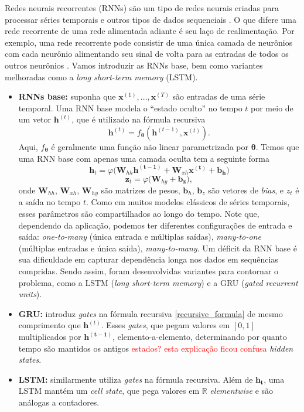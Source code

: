 \documentclass{automatextcc}
\newcommand{\pumi}[1]{\textcolor{red}{#1}}
\newcommand{\R}{\mathds{R}}
\newcommand{\bs}[1]{\boldsymbol{#1}}
\begin{document}
Redes neurais recorrentes (RNNs) são um tipo de redes neurais criadas para processar séries temporais e outros tipos de dados sequenciais \citep{fan2021}. O que difere uma rede recorrente de uma rede alimentada adiante é seu laço de realimentação. Por exemplo, uma rede recorrente pode consistir de uma única camada de neurônios com cada neurônio alimentando seu sinal de volta para as entradas de todos os outros neurônios \citep{haykin2008}. Vamos introduzir as RNNs base, bem como variantes melhoradas como a \textit{long short-term memory} (LSTM).


\begin{itemize}
    \item \textbf{RNNs base:} suponha que $\bs{x}^{(1)},\dots,\bs{x}^{(T)}$ são entradas de uma série temporal. Uma RNN base modela o ``estado oculto'' no tempo $t$ por meio de um vetor $\bs{h}^{(t)}$, que é utilizado na fórmula recursiva 
    \begin{equation}
        \label{recursive_formula}
        \bs{h}^{(t)} = f_{\bs{\theta}} (\bs{h}^{(t-1)},\bs{x}^{(t)}).
    \end{equation}
    Aqui, $f_{\bs{\theta}}$ é geralmente uma função não linear parametrizada por $\bs{\theta}$. Temos que uma RNN base com apenas uma camada oculta tem a seguinte forma
    \begin{equation*}
        \bs{h}_{t} = \varphi \bigl( \bs{W}_{hh} \bs{h^{(t-1)}} + \bs{W}_{xh} \bs{x^{(t)}} + \bs{b_h} \bigl)
    \end{equation*}
    \begin{equation*}
        \bs{z}_t = \varphi \bigl( \bs{W}_{hy} + \bs{b_z} \bigl),
    \end{equation*}
    onde $\bs{W}_{hh}$, $\bs{W}_{xh}$, $\bs{W}_{hy}$ são  matrizes de pesos, $\bs{b}_{h}$, $\bs{b}_{z}$ são vetores de \textit{bias}, e $z_t$ é a saída no tempo $t$. Como em muitos modelos clássicos de séries temporais, esses parâmetros são compartilhados ao longo do tempo. Note que, dependendo da aplicação, podemos ter diferentes configurações de entrada e saída: \textit{one-to-many} (única entrada e múltiplas saídas), \textit{many-to-one} (múltiplas entradas e única saída), \textit{many-to-many}. Um déficit da RNN base é sua dificuldade em capturar dependência longa nos dados em sequências compridas. Sendo assim, foram desenvolvidas variantes para contornar o problema, como a LSTM (\textit{long short-term memory}) e a GRU (\textit{gated recurrent units}).
    \item \textbf{GRU:} introduz \textit{gates} na fórmula recursiva \eqref{recursive_formula} de mesmo comprimento que $\bs h^{(t)}$. Esses \textit{gates}, que pegam valores em $[0,1]$ multiplicados por $\bs{h^{(t-1)}}$, elemento-a-elemento, determinando por quanto tempo são mantidos os antigos \pumi{estados? esta explicação ficou confusa} \textit{hidden states}.
    \item \textbf{LSTM:} similarmente utiliza \textit{gates} na fórmula recursiva. Além de $\bs{h_t}$, uma LSTM mantém um \textit{cell state}, que pega valores em $\R$ \textit{elementwise} e são análogas a contadores.
\end{itemize}
\end{document}
